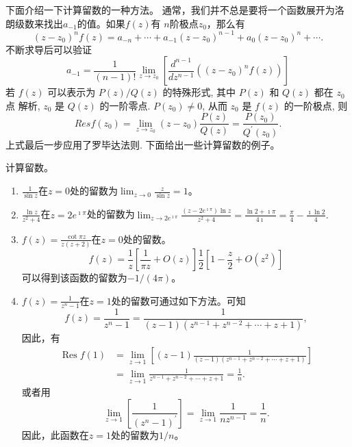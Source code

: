 下面介绍一下计算留数的一种方法。
通常，我们并不总是要将一个函数展开为洛朗级数来找出$a_{-1}$的值。如果$f(z)$有
$n$阶极点$z_0$，那么有
\begin{equation}
    \left(z-z_0\right)^n f(z)=a_{-n}+\cdots+a_{-1}\left(z-z_0\right)^{n-1}+a_0\left(z-z_0\right)^n+\cdots .
\end{equation}
不断求导后可以验证
\begin{equation}
    a_{-1}=\frac{1}{(n-1) !} \lim _{z \to z_0}\left[\frac{d^{n-1}}{d z^{n-1}}\left(\left(z-z_0\right)^n f(z)\right)\right]
\end{equation}
若 $f(z)$ 可以表示为 $P(z) / Q(z)$ 的特殊形式, 其中 $P(z)$ 和 $Q(z)$ 都在 $z_0$ 点 解析, $z_0$ 是 $Q(z)$ 的一阶零点. $P\left(z_0\right) \neq 0$, 从而 $z_0$ 是 $f(z)$ 的一阶极点, 则
\begin{equation}
    Res f\left(z_0\right)=\lim _{z \to z_0}\left(z-z_0\right) \frac{P(z)}{Q(z)}=\frac{P\left(z_0\right)}{Q^{\prime}\left(z_0\right)} .
\end{equation}
上式最后一步应用了罗毕达法则.
下面给出一些计算留数的例子。
\begin{examplebox}{计算留数。}
    
    \begin{enumerate}
        \item $\frac{1}{\sin z}$在$z=0$处的留数为$\lim_{z\to 0} \frac{z}{\sin{z}} = 1$。
        \item $\frac{\ln{z}}{z^2 + 4}$在$z=2e^{\imath \pi}$处的留数为$\lim_{z\to 2e^{\imath \pi}} \frac{(z-2e^{\imath \pi})\ln{z} }{z^2 + 4} = 
        \frac{\ln 2 + \imath \pi}{4\imath} = \frac{\pi}{4} - \frac{\imath\ln{2}}{4}.$
        \item $f(z) = \frac{\cot{\pi z}}{z(z+2)}$在$z=0$处的留数。\\
            \[
              f(z) = \frac{1}{z} \left[\frac{1}{\pi z} + O(z) \right]\frac{1}{2} \left[1 - \frac{z}{2} + O(z^2)\right]  
            \]
            可以得到该函数的留数为$-1/(4\pi)$。
        \item $f(z) = \frac{1}{z^n - 1}$在$z=1$处的留数可通过如下方法。可知
        \[
            f(z)=\frac{1}{z^n-1}=\frac{1}{(z-1)\left(z^{n-1}+z^{n-2}+\cdots+z+1\right)},
        \]
        因此，有
        \[
            \begin{aligned}
                \operatorname{Res} f(1) & =\lim _{z \to 1}\left[(z-1) \frac{1}{(z-1)\left(z^{n-1}+z^{n-2}+\cdots+z+1\right)}\right] \\
                & =\lim _{z \to 1} \frac{1}{z^{n-1}+z^{n-2}+\cdots+z+1}=\frac{1}{n} .
            \end{aligned}
        \]
        或者用 $$
        \lim _{z \to 1}\left[\frac{1}{\left(z^n-1\right)^{\prime}}\right]=\lim _{z \to 1} \frac{1}{n z^{n-1}}=\frac{1}{n} .
        $$ 因此，此函数在$z=1$处的留数为$1/n$。
    \end{enumerate}
\end{examplebox}


